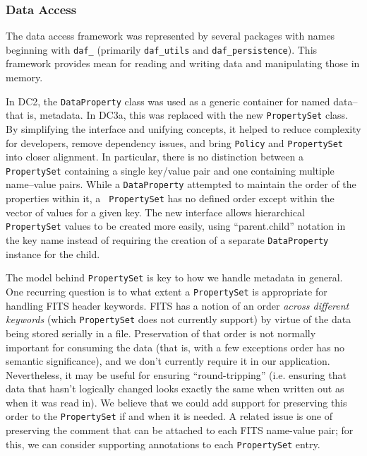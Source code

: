 
\subsubsection{Data Access}

The data access framework was represented by several packages with
names beginning with \texttt{daf\_} (primarily \texttt{daf\_utils}
and \texttt{daf\_persistence}).  This framework provides mean for
reading and writing data and manipulating those in memory.  

In DC2, the {\tt DataProperty} class was used as a generic container
for named data--that is, metadata.  In DC3a, this was replaced with
the new {\tt PropertySet} class.  By simplifying the interface and
unifying concepts, it helped to reduce complexity for developers,
remove dependency issues, and bring {\tt Policy} and {\tt PropertySet}
into closer alignment.  In particular, there is no distinction between
a {\tt PropertySet} containing a single key/value pair and one
containing multiple name--value pairs.  While a {\tt DataProperty}
attempted to maintain the order of the properties within it, a {\tt
PropertySet} has no defined order except within the vector of values
for a given key.  The new interface allows hierarchical {\tt
PropertySet} values to be created more easily, using ``parent.child''
notation in the key name instead of requiring the creation of a
separate {\tt DataProperty} instance for the child.  

The model behind {\tt PropertySet} is key to how we handle metadata in
general.  One recurring question is to what extent a {\tt PropertySet}
is appropriate for handling FITS header keywords.  FITS has a notion
of an order {\it across different keywords} (which {\tt PropertySet} does not
currently support) by virtue of the data being stored serially in a
file.  Preservation of that order is not normally important for
consuming the data (that is, with a few exceptions order has no
semantic significance), and we don't currently require it in our
application.  Nevertheless, it may be useful for ensuring
``round-tripping'' (i.e. ensuring that data that hasn't logically
changed looks exactly the same when written out as when it was read
in).  We believe that we could add support for preserving this order
to the {\tt PropertySet} if and when it is needed.   A related issue
is one of preserving the comment that can be attached to each FITS
name-value pair; for this, we can consider supporting annotations to
each {\tt PropertySet} entry.  

